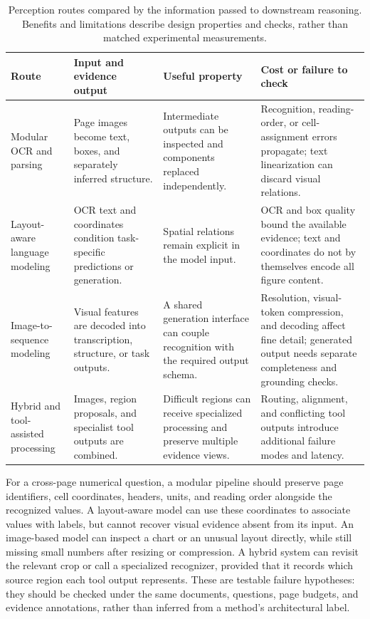 \begin{table}[t]
\centering
\small
\setlength{\tabcolsep}{4pt}
\renewcommand{\arraystretch}{1.15}
\begin{tabularx}{\textwidth}{@{}p{}XXX@{}}
\hline
\textbf{Route} & \textbf{Input and evidence output} & \textbf{Useful property} & \textbf{Cost or failure to check} \\
\hline
Modular OCR and parsing \cite{du2020ppocr} & Page images become text, boxes, and separately inferred structure. & Intermediate outputs can be inspected and components replaced independently. & Recognition, reading-order, or cell-assignment errors propagate; text linearization can discard visual relations. \\
Layout-aware language modeling \cite{xu2019layoutlm,wang2024docllm} & OCR text and coordinates condition task-specific predictions or generation. & Spatial relations remain explicit in the model input. & OCR and box quality bound the available evidence; text and coordinates do not by themselves encode all figure content. \\
Image-to-sequence modeling \cite{kim2022donut,vista_ocr_2024,ocean_ocr_2024} & Visual features are decoded into transcription, structure, or task outputs. & A shared generation interface can couple recognition with the required output schema. & Resolution, visual-token compression, and decoding affect fine detail; generated output needs separate completeness and grounding checks. \\
Hybrid and tool-assisted processing \cite{li2025monkeyocr,li2025dianjin} & Images, region proposals, and specialist tool outputs are combined. & Difficult regions can receive specialized processing and preserve multiple evidence views. & Routing, alignment, and conflicting tool outputs introduce additional failure modes and latency. \\
\hline
\end{tabularx}
\caption{Perception routes compared by the information passed to downstream reasoning. Benefits and limitations describe design properties and checks, rather than matched experimental measurements.}
\label{tab:perception_routes}
\end{table}

For a cross-page numerical question, a modular pipeline should preserve page identifiers, cell coordinates, headers, units, and reading order alongside the recognized values. A layout-aware model can use these coordinates to associate values with labels, but cannot recover visual evidence absent from its input. An image-based model can inspect a chart or an unusual layout directly, while still missing small numbers after resizing or compression. A hybrid system can revisit the relevant crop or call a specialized recognizer, provided that it records which source region each tool output represents. These are testable failure hypotheses: they should be checked under the same documents, questions, page budgets, and evidence annotations, rather than inferred from a method's architectural label.

